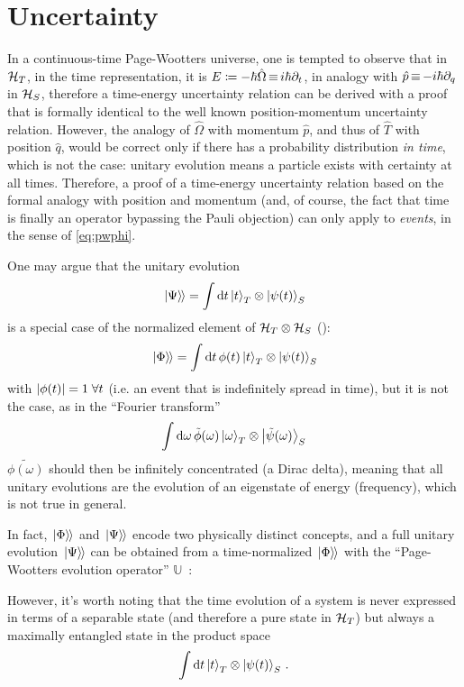 \section{Uncertainty}

In a continuous-time Page-Wootters universe,
one is tempted to observe that in $\mathcal{H}_T$,
in the time representation, it is $E \coloneqq -\hbar\hat{\Omega} \operatorname*{\equiv} i\hbar\partial_{t}$,
in analogy with $\hat{p} \operatorname*{\equiv} -i\hbar\partial_{q}$ in $\mathcal{H}_S$,
therefore a time-energy uncertainty relation can be derived
with a proof that is formally identical to the well known
position-momentum uncertainty relation. However, the analogy of
$\hat{\Omega}$ with momentum $\hat{p}$,
and thus of $\hat{T}$ with position $\hat{q}$,
would be correct only if there has a probability distribution \emph{in time},
which is not the case: unitary evolution means a particle exists with
certainty at all times. Therefore, a proof of a time-energy uncertainty
relation based on the formal analogy with position and momentum
(and, of course, the fact that time is finally an operator bypassing the Pauli objection)
can only apply to \emph{events}, in the sense of \eqref{eq:pwphi}.

One may argue that the unitary evolution
\[
  \left.\left| \Psi \right\rangle\hspace{-0.115em}\right\rangle = \int \dd{t} \ket{t}_T \otimes \ket{\psi(t)}_S
\]
is a special case of the normalized element of $\mathcal{H}_T\otimes\mathcal{H}_S$ ():
\[
  \left.\left| \Phi \right\rangle\hspace{-0.115em}\right\rangle = \int \dd{t} \phi(t) \ket{t}_T \otimes \ket{\psi(t)}_S
\]
with $\abs{\phi(t)}=1 \; \forall t$ (i.e. an event that is indefinitely spread in time),
but it is not the case, as in the ``Fourier transform''
\[
  \int \dd \omega \, \tilde{\phi}(\omega) \ket{\omega}_T \otimes \ket{\tilde{\psi}(\omega)}_S
\]
$\tilde{\phi(\omega)}$ should then be infinitely concentrated (a Dirac delta),
meaning that all unitary evolutions are the evolution of an eigenstate of energy (frequency),
which is not true in general.

In fact, $\left.\left| \Phi \right\rangle\hspace{-0.115em}\right\rangle$ and $\left.\left| \Psi \right\rangle\hspace{-0.115em}\right\rangle$ encode two physically distinct concepts,
and a full unitary evolution $\left.\left| \Psi \right\rangle\hspace{-0.115em}\right\rangle$ can be obtained from a time-normalized
$\left.\left| \Phi \right\rangle\hspace{-0.115em}\right\rangle$ with the ``Page-Wootters evolution operator'' $\mathbb{U}$~\parencite{Lloyd:Time}: 












However, it's worth
noting that the time evolution of a system is never expressed
in terms of a separable state (and therefore a pure state in $\mathcal{H}_T$)
but always a maximally entangled state in the product space
\begin{equation}
  \int \dd t \ket{t}_T \otimes \ket{\psi(t)}_S \, \text{.}
\end{equation}


